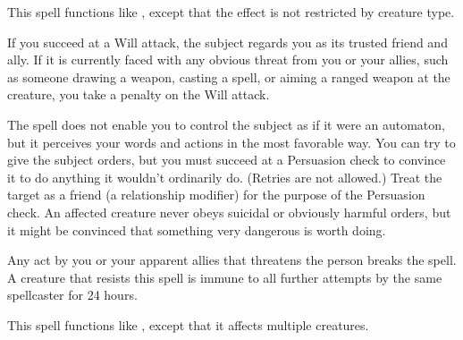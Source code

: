 \begin{spelleffect}
  This spell functions like , except that the effect is not restricted by creature type.
\end{spelleffect}

\spellrng{\rngmed}
\spelldur{\durlong}
\begin{spelleffect}
    If you succeed at a Will attack, the subject regards you as its trusted friend and ally. If it is currently faced with any obvious threat from you or your allies, such as someone drawing a weapon, casting a spell, or aiming a ranged weapon at the creature, you take a  penalty on the Will attack.
  \par The spell does not enable you to control the subject as if it were an automaton, but it perceives your words and actions in the most favorable way. You can try to give the subject orders, but you must succeed at a Persuasion check to convince it to do anything it wouldn't ordinarily do. (Retries are not allowed.) Treat the target as a friend (a  relationship modifier) for the purpose of the Persuasion check. An affected creature never obeys suicidal or obviously harmful orders, but it might be convinced that something very dangerous is worth doing.
\end{spelleffect}
\begin{spellnotes}
  Any act by you or your apparent allies that threatens the  person breaks the spell. A creature that resists this spell is immune to all further attempts by the same spellcaster for 24 hours.
\end{spellnotes}

\begin{spelleffect}
  This spell functions like , except that it affects multiple creatures.
\end{spelleffect}


